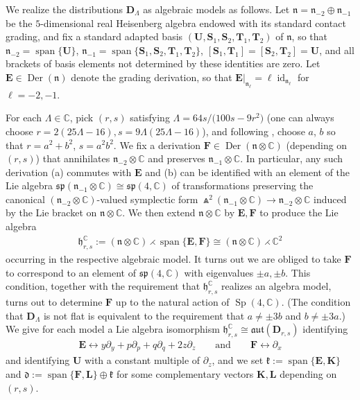 \documentclass[10pt,a4paper]{amsart}
\DeclareMathOperator{\Der} {Der}
\DeclareMathOperator{\id} {id}
\DeclareMathOperator{\Sp} {Sp}
\DeclareMathOperator{\spanOperator}{span}
\newcommand{\Span}[1]{\spanOperator\{{#1}\}}
\newcommand{\bbC}{\mathbb{C}}
\newcommand{\mbD}{\mathbf{D}}
\newcommand{\mbE}{\mathbf{E}}
\newcommand{\mbF}{\mathbf{F}}
\newcommand{\mbK}{\mathbf{K}}
\newcommand{\mbL}{\mathbf{L}}
\newcommand{\mbS}{\mathbf{S}}
\newcommand{\mbT}{\mathbf{T}}
\newcommand{\mbU}{\mathbf{U}}
\newcommand{\mfd} {\mathfrak{d}}
\newcommand{\mfh} {\mathfrak{h}}
\newcommand{\mfk} {\mathfrak{k}}
\newcommand{\mfn} {\mathfrak{n}}
\newcommand{\mfaut}{\mathfrak{aut}}
\newcommand{\mfsp} {\mathfrak{sp}}
\numberwithin{equation}{section}
\begin{document}
We realize the distributions $\mbD_{\Lambda}$ as algebraic models as follows. Let $\mfn = \mfn_{-2} \oplus \mfn_{-1}$ be the $5$-dimensional real Heisenberg algebra endowed with its standard contact grading, and fix a standard adapted basis $(\mbU, \mbS_1, \mbS_2, \mbT_1, \mbT_2)$ of $\mfn$, so that $\mfn_{-2} = \Span{\mbU}$, $\mfn_{-1} = \Span{\mbS_1, \mbS_2, \mbT_1, \mbT_2}$, $[\mbS_1, \mbT_1] = [\mbS_2, \mbT_2] = \mbU$, and all brackets of basis elements not determined by these identities are zero. Let $\mbE \in \Der(\mfn)$ denote the grading derivation, so that $\mbE\vert_{\mfn_\ell} = \ell \id_{\mfn_\ell}$ for $\ell = -2, -1$.

For each $\Lambda \in \bbC$, pick $(r, s)$ satisfying $\Lambda = 64 s / \big(100 s - 9 r^2\big)$ (one can always choose $r = 2 (25 \Lambda - 16), s = 9 \Lambda (25 \Lambda - 16)$), and following \cite[Section~3]{DoubrovKruglikov}, choose $a$, $b$ so that $r = a^2 + b^2$, $s = a^2 b^2$. We fix a derivation $\mbF \in \Der(\mfn \otimes \bbC)$ (depending on $(r, s)$) that annihilates $\mfn_{-2} \otimes \bbC$ and preserves $\mfn_{-1} \otimes \bbC$. In particular, any such derivation (a) commutes with $\mbE$ and (b) can be identified with an element of the Lie algebra $\mfsp(\mfn_{-1} \otimes \bbC) \cong \mfsp(4, \bbC)$ of transformations preserving the canonical $(\mfn_{-2} \otimes \bbC)$-valued symplectic form $\Wedge^2 (\mfn_{-1} \otimes \bbC) \to \mfn_{-2} \otimes \bbC$ induced by the Lie bracket on $\mfn \otimes \bbC$. We then extend $\mfn \otimes \bbC$ by $\mbE, \mbF$ to produce the Lie algebra
 \begin{gather*}
	 \boxed{
		 \mfh_{r, s}^{\bbC} := (\mfn \otimes \bbC) \rightthreetimes \Span{\mbE, \mbF} \cong (\mfn \otimes \bbC) \rightthreetimes \bbC^2
 }
 \end{gather*}
occurring in the respective algebraic model. It turns out we are obliged to take $\mbF$ to correspond to an element of $\mfsp(4, \bbC)$ with eigenvalues $\pm a, \pm b$. This condition, together with the requirement that $\mfh_{r, s}^{\bbC}$ realizes an algebra model, turns out to determine $\mbF$ up to the natural action of $\Sp(4, \bbC)$. (The condition that $\mbD_{\Lambda}$ is not flat is equivalent to the requirement that $a \neq \pm 3b$ and $b \neq \pm 3a$.) We give for each model a Lie algebra isomorphism $\mfh_{r, s}^{\bbC} \cong \mfaut(\mbD_{r, s})$ identifying
 \begin{gather*}
 \mbE \leftrightarrow y \partial_y + p \partial_p + q \partial_q + 2 z \partial_z
 \qquad \textrm{and} \qquad
 \mbF \leftrightarrow \partial_x
 \end{gather*}
and identifying $\mbU$ with a constant multiple of $\partial_z$, and we set $\mfk := \Span{\mbE, \mbK}$ and $\mfd := \Span{\mbF, \mbL} \oplus \mfk$ for some complementary vectors $\mbK, \mbL$ depending on $(r, s)$.
\end{document}
